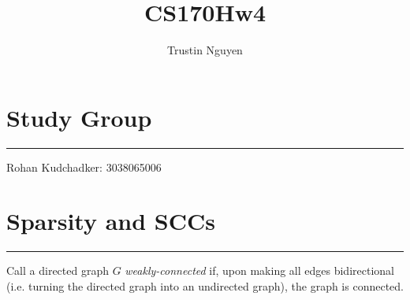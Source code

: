 \documentclass{article}
\title{CS170Hw4}
\author{Trustin Nguyen}
\begin{document}
    \maketitle

\reversemarginpar

\section*{Study Group}
\hrule
Rohan Kudchadker: 3038065006

\newpage
\section*{Sparsity and SCCs}
\hrule

Call a directed graph $G$ \textit{weakly-connected} if, upon making all edges bidirectional (i.e. turning the directed graph into an undirected graph), the graph is connected.
\end{document}
